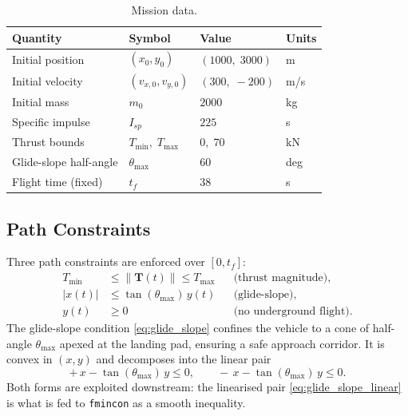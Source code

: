 \documentclass[../main.tex]{subfiles}
\begin{document}
\begin{table}[H]
\centering
\caption{Mission data.}
\label{tab:hm2_data}
\begin{tabular}{llll}
\toprule
Quantity                & Symbol                & Value             & Units \\
\midrule
Initial position        & $(x_0, y_0)$          & $(1000,\; 3000)$  & m     \\
Initial velocity        & $(v_{x,0}, v_{y,0})$  & $(300,\; -200)$   & m/s   \\
Initial mass            & $m_0$                 & $2000$            & kg    \\
Specific impulse        & $I_{sp}$              & $225$             & s     \\
Thrust bounds           & $T_{\min},\; T_{\max}$ & $0,\; 70$        & kN    \\
Glide-slope half-angle  & $\theta_{\max}$       & $60$              & deg   \\
Flight time (fixed)     & $t_f$                 & $38$              & s     \\
\bottomrule
\end{tabular}
\end{table}

\subsection{Path Constraints}\label{sec:hm2_path}

Three path constraints are enforced over $[0, t_f]$:
\begin{align}
    T_{\min} &\leq \|\mathbf{T}(t)\| \leq T_{\max}
        && \text{(thrust magnitude)},
        \label{eq:thrust_bound}\\
    |x(t)| &\leq \tan(\theta_{\max})\,y(t)
        && \text{(glide-slope)},
        \label{eq:glide_slope}\\
    y(t) &\geq 0
        && \text{(no underground flight)}.
        \label{eq:altitude}
\end{align}
The glide-slope condition \eqref{eq:glide_slope} confines the vehicle to a cone of half-angle $\theta_{\max}$ apexed at the landing pad, ensuring a safe approach corridor. It is convex in $(x, y)$ and decomposes into the linear pair
\begin{equation}
    +\,x - \tan(\theta_{\max})\,y \leq 0,\qquad -\,x - \tan(\theta_{\max})\,y \leq 0.
    \label{eq:glide_slope_linear}
\end{equation}
Both forms are exploited downstream: the linearised pair \eqref{eq:glide_slope_linear} is what is fed to \texttt{fmincon} as a smooth inequality.
\end{document}
